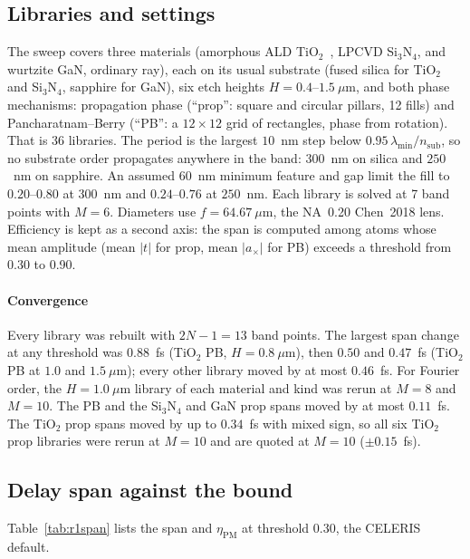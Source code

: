 \documentclass[preprint,12pt]{elsarticle}
\begin{document}
\subsection{Libraries and settings}
The sweep covers three materials (amorphous ALD TiO$_2$~\cite{siefke2016}, LPCVD
Si$_3$N$_4$, and wurtzite GaN, ordinary ray), each on its usual substrate (fused
silica for TiO$_2$ and Si$_3$N$_4$, sapphire for GaN), six etch heights
$H=0.4$--$1.5~\mu$m, and both phase mechanisms: propagation phase (``prop'': square and
circular pillars, 12 fills) and Pancharatnam--Berry (``PB'': a $12\times12$ grid of
rectangles, phase from rotation). That is 36 libraries. The period is the largest
$10$~nm step below $0.95\,\lambda_\mathrm{min}/n_\mathrm{sub}$, so no substrate order
propagates anywhere in the band: $300$~nm on silica and $250$~nm on sapphire. An
assumed $60$~nm minimum feature and gap limit the fill to $0.20$--$0.80$ at $300$~nm
and $0.24$--$0.76$ at $250$~nm. Each library is solved at 7 band points with $M=6$.
Diameters use $f=64.67~\mu$m, the NA~0.20 Chen~2018 lens. Efficiency is kept as a second
axis: the span is computed among atoms whose mean amplitude (mean $|t|$ for prop, mean
$|a_\times|$ for PB) exceeds a threshold from 0.30 to 0.90.

\paragraph{Convergence}
Every library was rebuilt with $2N-1=13$ band points. The largest span change at any
threshold was $0.88$~fs (TiO$_2$ PB, $H=0.8~\mu$m), then $0.50$ and $0.47$~fs (TiO$_2$
PB at $1.0$ and $1.5~\mu$m); every other library moved by at most $0.46$~fs. For Fourier
order, the $H=1.0~\mu$m library of each material and kind was rerun at $M=8$ and $M=10$.
The PB and the Si$_3$N$_4$ and GaN prop spans moved by at most $0.11$~fs. The TiO$_2$
prop spans moved by up to $0.34$~fs with mixed sign, so all six TiO$_2$ prop libraries
were rerun at $M=10$ and are quoted at $M=10$ ($\pm0.15$~fs).

\subsection{Delay span against the bound}
Table~\ref{tab:r1span} lists the span and $\eta_\mathrm{PM}$ at threshold 0.30, the
CELERIS default.
\end{document}
